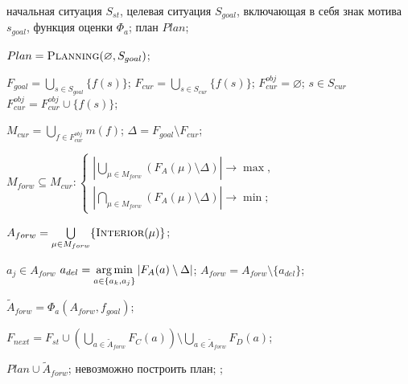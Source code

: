 	\Require начальная ситуация $S_{st}$, целевая ситуация $S_{goal}$, включающая в себя знак мотива $s_{goal}$, функция оценки $\Phi_a$;
	\Ensure план $Plan$;
	\algrule

	\State $Plan=\Call{Planning}{\varnothing,S_{goal}}$;

		\State $F_{goal}=\bigcup\limits_{s\in S_{goal}}\{f(s)\}$; 
		\State $F_{cur}=\bigcup\limits_{s\in S_{cur}}\{f(s)\}$; 
		\State $F_{cur}^{obj}=\varnothing$; 
		\ForAll $s\in S_{cur}$
				\State $F_{cur}^{obj}= F_{cur}^{obj}\cup\{f(s)\}$; 
			\EndIf
		\EndFor
		
		\State $M_{cur}=\bigcup\limits_{f\in F_{cur}^{obj}}m(f)$;
		\State $\Delta=F_{goal}\setminus F_{cur}$; 
		
		\State $M_{forw}\subseteq M_{cur}:\begin{cases}
			\left|\bigcup\limits_{\mu\in M_{forw}}\left(F_A(\mu)\setminus\Delta\right)\right|\rightarrow\max,\\
			\left|\bigcap\limits_{\mu\in M_{forw}}\left(F_A(\mu)\setminus\Delta\right)\right|\rightarrow\min;
		\end{cases}$ 
		
		\State $A_{forw} = \bigcup\limits_{\mu\in M_{forw}}\{\Call{Interior}{\mu}\}$; 
				
		\ForAll $a_j\in A_{forw}$
				\State $a_{del}=\operatorname*{arg\,min}\limits_{a\in\{a_k,a_j\}}|F_A(a)\setminus\Delta|$;
				\State $A_{forw}= A_{forw}\setminus\{a_{del}\}$; 
			\EndIf
		\EndFor
		
		\State $\tilde A_{forw}=\Phi_a(A_{forw},f_{goal})$; 
		
		\State $F_{next}=F_{st}\cup\left(\bigcup\limits_{a\in \tilde A_{forw}}F_C(a)\right)\setminus\bigcup\limits_{a\in \tilde A_{forw}}F_D(a)$; 
		
			\State \Return $Plan\cup{\tilde A_{forw}}$;		
		\Else
				\State\Return невозможно построить план;
			\Else
				\State \Return {};						
			\EndIf
		\EndIf

	\EndFunction